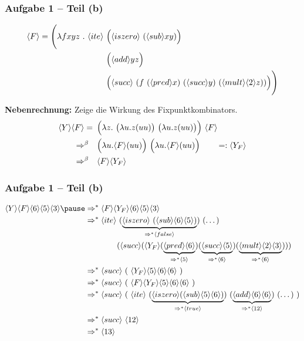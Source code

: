 \documentclass{beamer}
\newcommand{\num}[1]{\ensuremath{\langle #1 \rangle}}
\begin{document}
\begin{frame} \frametitle{Aufgabe 1 -- Teil (b)}
	\footnotesize
	\begin{align*}
		\num{F} = \Biggl( \lambda f xyz \ . \ \num{ite} \ &\Bigl(\num{iszero} \ (\num{sub} x y )\Bigr) \\ &\Bigl( \num{add} y z \Bigr) \\
		&\Bigl( \num{succ} \ ( f \ (\num{pred} x) \ (\num{succ} y) \ ( \num{mult} \num{2} z )) \Bigr) \Biggr)
	\end{align*}
	
	\pause
	
	\textbf{Nebenrechnung:} Zeige die Wirkung des Fixpunktkombinators.
	\begin{align*}
		\num{Y} \num{F}
		= \enskip &\Bigl( \lambda z . \ \bigl( \lambda u . z (uu) \bigr) \ \bigl( \lambda u. z (uu) \bigr) \Bigr) \ \num{F} \\
		\Rightarrow^{\beta} \quad &\Bigl( \lambda u . \num{F} (uu) \Bigr) \ \Bigl( \lambda u. \num{F} (uu) \Bigr) \qquad =: \num{Y_F} \\
		\Rightarrow^{\beta} \quad &\num{F} \num{Y_F}
	\end{align*}
\end{frame}
%
\begin{frame} \frametitle{Aufgabe 1 -- Teil (b)}
	\footnotesize
	\begin{align*}
		\num{Y} \num{F} \num{6} \num{5} \num{3} \pause &\Rightarrow^\ast \num{F} \num{Y_F} \num{6} \num{5} \num{3} \\
		&\Rightarrow^\ast \num{ite} \ 
		(\underbrace{\num{iszero} \ (\num{sub}\num{6}\num{5})}_{\Rightarrow^\ast \num{false}}) \ 
		( \dots ) \\
		& \phantom{\Rightarrow^\ast \num{ite}} \ (\num{succ} (\num{Y_F}(\underbrace{\num{pred}\num{6}}_{\Rightarrow^\ast \num{5}})(\underbrace{\num{succ}\num{5}}_{\Rightarrow^\ast \num{6}})(\underbrace{\num{mult}\num{2}\num{3}}_{\Rightarrow^\ast \num{6}}))) \\
		&\Rightarrow^\ast \num{succ} \  ( \ \num{Y_F}\num{5}\num{6}\num{6} \ ) \\
		&\Rightarrow^\ast \num{succ} \ ( \ \num{F} \num{Y_F} \num{5}\num{6}\num{6} \ ) \\
		&\Rightarrow^\ast \num{succ} \ ( \ \num{ite} \  (\underbrace{\num{iszero}(\num{sub}\num{5}\num{6})}_{\Rightarrow^\ast \num{true}}) \ (\underbrace{\num{add}\num{6}\num{6}}_{\Rightarrow^\ast \num{12}})  \ (\dots) \ ) \\
		&\Rightarrow^\ast \num{succ} \ \num{12} \\
		&\Rightarrow^\ast \num{13}
	\end{align*}
\end{frame}
\end{document}
